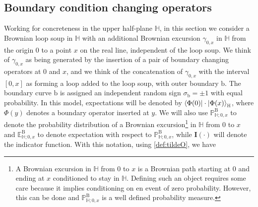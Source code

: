 \documentclass[a4paper,11pt]{article}
\begin{document}
\medskip

\subsection{Boundary condition changing operators} \label{sec:bcc-ops}

Working for concreteness in the upper half-plane $\mathbb{H}$, in this section we consider a Brownian loop soup in $\mathbb{H}$ with an additional Brownian excursion $\gamma_{0,x}$ in $\mathbb{H}$ from the origin $0$ to a point $x$ on the real line, independent of the loop soup. We think of $\gamma_{0,x}$ as being generated by the insertion of a pair of %
boundary changing operators at $0$ and $x$, and we think of the concatenation of $\gamma_{0,x}$ with the interval $[0,x]$ as forming a loop added to the loop soup, with outer boundary $\text{b}$. The boundary curve $\text{b}$ is assigned an independent random sign $\sigma_{\text{b}}=\pm 1$ with equal probability. In this model, expectations will be denoted by $\Braket{\Phi(0) \vert \cdot \vert \Phi(x)}_{\mathbb{H}}$, where $\Phi(y)$ denotes a boundary operator inserted at $y$. We will also use $\mathbb{P}^{\text{B}}_{\mathbb{H};0,x}$ to denote the probability distribution of a Brownian excursion\footnote{A Brownian excursion in $\mathbb{H}$ from $0$ to $x$ is a Brownian path starting at $0$ and ending at $x$ conditioned to stay in $\mathbb{H}$. Defining such an object requires some care because it implies conditioning on en event of zero probability. However, this can be done and $\mathbb{P}^{\text{B}}_{\mathbb{H};0,x}$ is a well defined probability measure.} in $\mathbb{H}$ from $0$ to $x$ and $\mathbb{E}^{\text{B}}_{\mathbb{H};0,x}$ to denote expectation with respect to $\mathbb{P}^{\text{B}}_{\mathbb{H};0,x}$, while $\mathbf{I}(\cdot)$ will denote the indicator function. With this notation, using \eqref{def:tildeO}, we have
\end{document}
